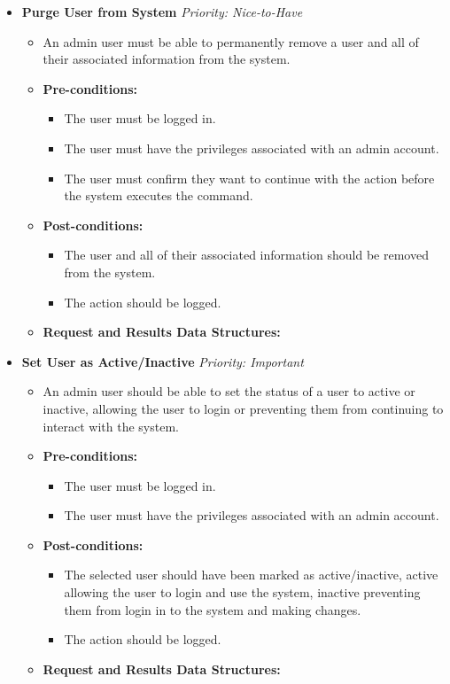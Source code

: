 \documentclass{article}
\begin{document}
\begin{itemize}
					\item \textbf{Purge User from System} \hfill \textit{Priority: Nice-to-Have}
					\begin{itemize}
						\item An admin user must be able to permanently remove a user and all of their associated information from the system.
						\item \textbf{Pre-conditions:}
						\begin{itemize}
							\item The user must be logged in.
							\item The user must have the privileges associated with an admin account.
							\item The user must confirm they want to continue with the action before the system executes the command.
						\end{itemize}
						\item \textbf{Post-conditions:}
						\begin{itemize}
							\item The user and all of their associated information should be removed from the system.
							\item The action should be logged.
						\end{itemize}
						\item \textbf{Request and Results Data Structures:}
					\end{itemize}
					
					\item \textbf{Set User as Active/Inactive} \hfill \textit{Priority: Important}
					\begin{itemize}
						\item An admin user should be able to set the status of a user to active or inactive, allowing the user to login or preventing them from continuing to interact with the system.
						\item \textbf{Pre-conditions:}
						\begin{itemize}
							\item The user must be logged in.
							\item The user must have the privileges associated with an admin account.
						\end{itemize}
						\item \textbf{Post-conditions:}
						\begin{itemize}
							\item The selected user should have been marked as active/inactive, active allowing the user to login and use the system, inactive preventing them from login in to the system and making changes.
							\item The action should be logged.
						\end{itemize}
						\item \textbf{Request and Results Data Structures:}
					\end{itemize}					
					

\end{itemize}
\end{document}
